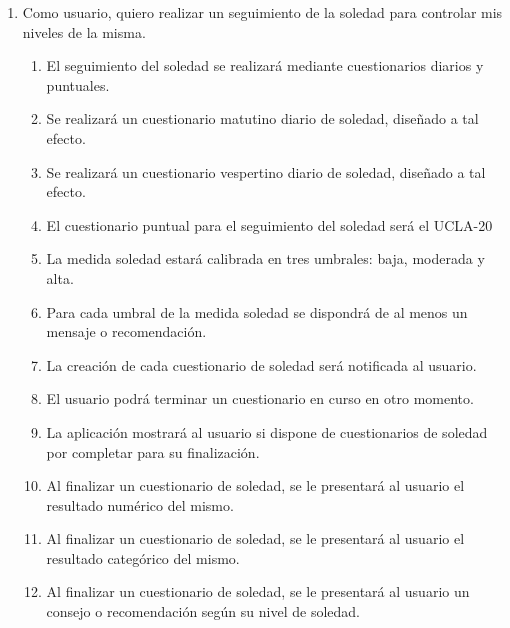         \begin{enumerate}[resume=req-usuario,label=\textbf{\texttt{RU-\arabic*}}]
            \item Como usuario, quiero realizar un seguimiento de la soledad para controlar mis niveles de la misma.
            \begin{enumerate}[resume=req-funcionales,label=\textbf{\texttt{RF-\arabic*}}]
                \item El seguimiento del soledad se realizará mediante cuestionarios diarios y puntuales.
                \item Se realizará un cuestionario matutino diario de soledad, diseñado a tal efecto.
                \item Se realizará un cuestionario vespertino diario de soledad, diseñado a tal efecto.
                \item El cuestionario puntual para el seguimiento del soledad será el UCLA-20
                \item La medida soledad estará calibrada en tres umbrales: baja, moderada y alta.
                \item Para cada umbral de la medida soledad se dispondrá de al menos un mensaje o recomendación.
                \item La creación de cada cuestionario de soledad será notificada al usuario.
                \item El usuario podrá terminar un cuestionario en curso en otro momento.
                \item La aplicación mostrará al usuario si dispone de cuestionarios de soledad por completar para su finalización.
                \item Al finalizar un cuestionario de soledad, se le presentará al usuario el resultado numérico del mismo.
                \item Al finalizar un cuestionario de soledad, se le presentará al usuario el resultado categórico del mismo.
                \item Al finalizar un cuestionario de soledad, se le presentará al usuario un consejo o recomendación según su nivel de soledad.
            \end{enumerate}
        \end{enumerate}
